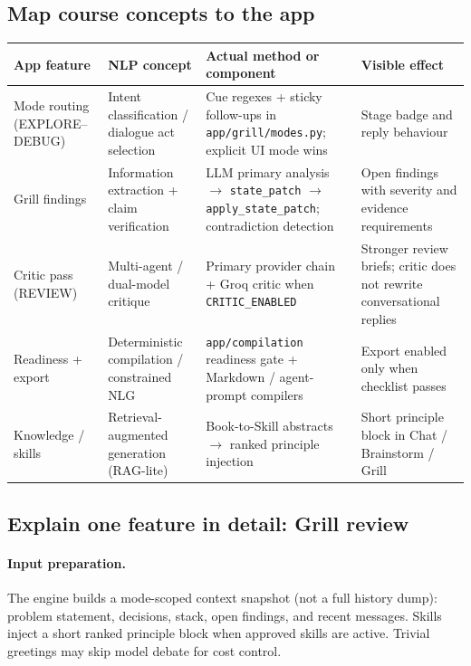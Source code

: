 \documentclass[11pt,a4paper]{article}
\begin{document}
\subsection{Map course concepts to the app}
{\footnotesize
\begin{tabularx}{\textwidth}{@{}L{2.4cm} L{2.6cm} Y L{2.6cm}@{}}
\toprule
\textbf{App feature} & \textbf{NLP concept} & \textbf{Actual method or component} & \textbf{Visible effect} \\
\midrule
Mode routing (EXPLORE--DEBUG)
  & Intent classification / dialogue act selection
  & Cue regexes + sticky follow-ups in \texttt{app/grill/modes.py}; explicit UI mode wins
  & Stage badge and reply behaviour \\
\addlinespace
Grill findings
  & Information extraction + claim verification
  & LLM primary analysis \(\rightarrow\) \texttt{state\_patch} \(\rightarrow\) \texttt{apply\_state\_patch}; contradiction detection
  & Open findings with severity and evidence requirements \\
\addlinespace
Critic pass (REVIEW)
  & Multi-agent / dual-model critique
  & Primary provider chain + Groq critic when \texttt{CRITIC\_ENABLED}
  & Stronger review briefs; critic does not rewrite conversational replies \\
\addlinespace
Readiness + export
  & Deterministic compilation / constrained NLG
  & \texttt{app/compilation} readiness gate + Markdown / agent-prompt compilers
  & Export enabled only when checklist passes \\
\addlinespace
Knowledge / skills
  & Retrieval-augmented generation (RAG-lite)
  & Book-to-Skill abstracts \(\rightarrow\) ranked principle injection
  & Short principle block in Chat / Brainstorm / Grill \\
\bottomrule
\end{tabularx}
}

\subsection{Explain one feature in detail: Grill review}
\paragraph{Input preparation.}
The engine builds a mode-scoped context snapshot (not a full history dump):
problem statement, decisions, stack, open findings, and recent messages.
Skills inject a short ranked principle block when approved skills are active.
Trivial greetings may skip model debate for cost control.
\end{document}
